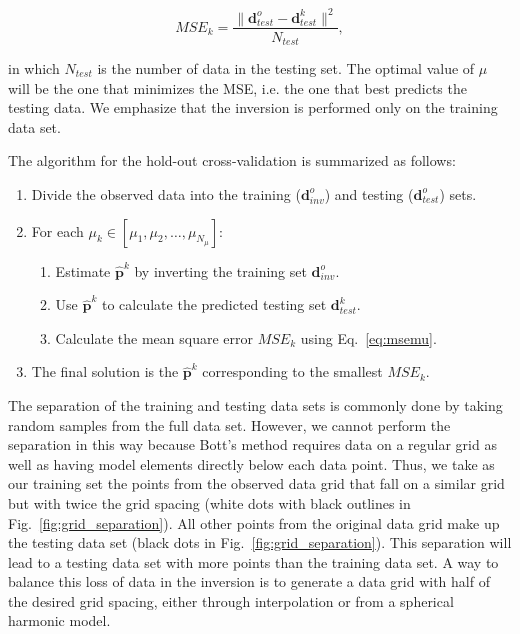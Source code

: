 \documentclass[extra]{gji}
\begin{document}
\begin{equation}
    MSE_k = \dfrac{\|\mathbf{d}^o_{test} - \mathbf{d}^k_{test}\|^2}{N_{test}},
    \label{eq:msemu}
\end{equation}

\noindent
in which $N_{test}$ is the number of data in the testing set.
The optimal value of $\mu$ will be the one that minimizes the MSE,
i.e. the one that best predicts the testing data.
We emphasize that the inversion is performed only on the training data set.

The algorithm for the hold-out cross-validation is summarized as follows:

\begin{enumerate}
    \item Divide the observed data into
        the training ($\mathbf{d}^o_{inv}$)
        and testing ($\mathbf{d}^o_{test}$) sets.
    \item For each $\mu_k \in [\mu_1, \mu_2, \ldots, \mu_{N_{\mu}}]$:
    \begin{enumerate}
        \item Estimate $\mathbf{\hat{p}}^k$ by inverting the training set
            $\mathbf{d}^o_{inv}$.
        \item Use $\mathbf{\hat{p}}^k$ to calculate the predicted testing set
            $\mathbf{d}^k_{test}$.
        \item Calculate the mean square error $MSE_k$ using Eq.~\ref{eq:msemu}.
    \end{enumerate}
    \item The final solution is the $\mathbf{\hat{p}}^k$ corresponding to the
        smallest $MSE_k$.
\end{enumerate}

The separation of the training and testing data sets is commonly done by taking
random samples from the full data set.
However, we cannot perform the separation in this way because
Bott's method requires data on a regular grid as well as having model elements
directly below each data point.
Thus, we take as our training set the points from the observed data grid that
fall on a similar grid but with twice the grid spacing
(white dots with black outlines in Fig.~\ref{fig:grid_separation}).
All other points from the original data grid
make up the testing data set
(black dots in Fig.~\ref{fig:grid_separation}).
This separation will lead to
a testing data set with more points than the training data set.
A way to balance this loss of data in the inversion
is to generate a data grid with half of the desired grid spacing,
either through interpolation
or from a spherical harmonic model.
\end{document}
